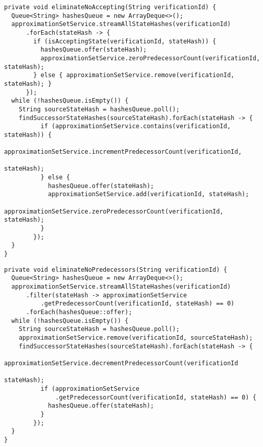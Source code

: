 \begin{minipage}{\linewidth}
\begin{lstlisting}[caption={Implementacja funkcji usuwającej stany nieakceptujące ze zbioru.},captionpos=b,label={lst:eliminateNoAcceptingStates}]
private void eliminateNoAccepting(String verificationId) {
  Queue<String> hashesQueue = new ArrayDeque<>();
  approximationSetService.streamAllStateHashes(verificationId)
      .forEach(stateHash -> {
        if (isAcceptingState(verificationId, stateHash)) {
          hashesQueue.offer(stateHash);
          approximationSetService.zeroPredecessorCount(verificationId, stateHash);
        } else { approximationSetService.remove(verificationId, stateHash); }
      });
  while (!hashesQueue.isEmpty()) {
    String sourceStateHash = hashesQueue.poll();
    findSuccessorStateHashes(sourceStateHash).forEach(stateHash -> {
          if (approximationSetService.contains(verificationId, stateHash)) {
            approximationSetService.incrementPredecessorCount(verificationId,
                                                              stateHash);
          } else {
            hashesQueue.offer(stateHash);
            approximationSetService.add(verificationId, stateHash);
            approximationSetService.zeroPredecessorCount(verificationId, stateHash);
          }
        });
  }
}
\end{lstlisting}
\end{minipage}
\begin{minipage}{\linewidth}
\begin{lstlisting}[caption={Implementacja funkcji usuwającej stany niemające poprzedników ze zbioru.},captionpos=b,label={lst:eliminateNoPredecessorsStates}]
private void eliminateNoPredecessors(String verificationId) {
  Queue<String> hashesQueue = new ArrayDeque<>();
  approximationSetService.streamAllStateHashes(verificationId)
      .filter(stateHash -> approximationSetService
          .getPredecessorCount(verificationId, stateHash) == 0)
      .forEach(hashesQueue::offer);
  while (!hashesQueue.isEmpty()) {
    String sourceStateHash = hashesQueue.poll();
    approximationSetService.remove(verificationId, sourceStateHash);
    findSuccessorStateHashes(sourceStateHash).forEach(stateHash -> {
          approximationSetService.decrementPredecessorCount(verificationId
                                                            stateHash);
          if (approximationSetService
              .getPredecessorCount(verificationId, stateHash) == 0) {
            hashesQueue.offer(stateHash);
          }
        });
  }
}
\end{lstlisting}
\end{minipage}


